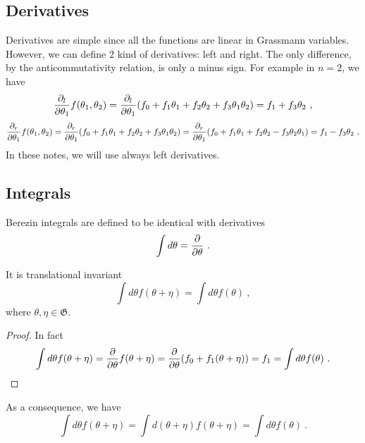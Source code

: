 \subsection{Derivatives}

    Derivatives are simple since all the functions are linear in Grassmann variables. However, we can define $2$ kind of derivatives: left and right. The only difference, by the anticommutativity relation, is only a minus sign. For example in $n = 2$, we have 
    \begin{equation*}
        \frac{\partial_l}{\partial\theta_1} f(\theta_1, \theta_2) = \frac{\partial_l}{\partial\theta_1} (f_0 + f_1 \theta_1 + f_2 \theta_2 + f_3 \theta_1 \theta_2) = f_1 + f_3 \theta_2 ~,
    \end{equation*}
    \begin{equation*}
        \frac{\partial_r}{\partial\theta_1} f(\theta_1, \theta_2) = \frac{\partial_r}{\partial\theta_1} (f_0 + f_1 \theta_1 + f_2 \theta_2 + f_3 \theta_1 \theta_2) = \frac{\partial_r}{\partial\theta_1} (f_0 + f_1 \theta_1 + f_2 \theta_2 - f_3 \theta_2 \theta_1) = f_1 - f_3 \theta_2 ~.
    \end{equation*}
    In these notes, we will use always left derivatives.

\subsection{Integrals}

    Berezin integrals are defined to be identical with derivatives
    \begin{equation*}
        \int d\theta = \frac{\partial}{\partial\theta} ~.
    \end{equation*}

    It is translational invariant
    \begin{equation*}
        \int d\theta f(\theta + \eta) = \int d\theta f(\theta) ~,
    \end{equation*}
    where $\theta, \eta \in \mathfrak G$.
    \begin{proof}
        In fact 
        \begin{equation*}
            \int d\theta f(\theta + \eta) = \frac{\partial}{\partial\theta} f(\theta + \eta) = \frac{\partial}{\partial\theta} (f_0 + f_1 (\theta + \eta)) = f_1 = \int d\theta f(\theta) ~.
        \end{equation*}
    \end{proof}

    As a consequence, we have 
    \begin{equation*}
        \int d\theta f(\theta + \eta) = \int d(\theta + \eta) f(\theta + \eta) = \int d\theta f(\theta) ~.
    \end{equation*}

